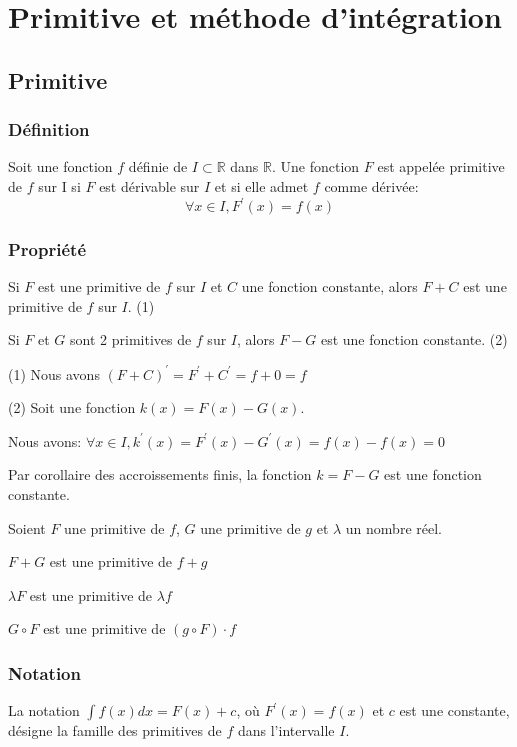 \documentclass[12pt,a4paper]{report}
\begin{document}
	\chapter[Analyse]{Primitive et méthode d'intégration}
	\section*{Primitive}
	\subsection*{Définition}
	Soit une fonction $f$ définie de $I \subset \mathbb{R}$ dans $\mathbb{R}$. Une fonction $F$ est appelée primitive de $f$ sur I si $F$ est dérivable sur $I$ et si elle admet $f$ comme dérivée:\[\forall x \in I,F^{'}(x)=f(x) \]
	\subsection*{Propriété}
	Si $F$ est une primitive de $f$ sur $I$ et $C$ une fonction constante, alors $F+C$ est une primitive de $f$ sur $I$. (1)
	
	Si $F$ et $G$ sont 2 primitives de $f$ sur $I$, alors $F-G$ est une fonction constante. (2)
	
	(1) Nous avons $(F+C)^{'}=F^{'}+C^{'}=f+0=f$
	
	(2) Soit une fonction $k(x)=F(x)-G(x)$.
	
		Nous avons: $\forall x \in I,k^{'}(x)=F^{'}(x)-G^{'}(x)=f(x)-f(x)=0$
		
		Par corollaire des accroissements finis, la fonction $k=F-G$ est une fonction constante.
		
		
	Soient $F$ une primitive de $f$, $G$ une primitive de $g$ et $\lambda$ un nombre réel.
	
	\hspace{1cm} $F+G$ est une primitive de $f+g$
	
	\hspace{1cm} $\lambda F$ est une primitive de $\lambda f$
	
	\hspace{1cm} $G \circ F$ est une primitive de $(g \circ F)\cdot f$	
	
	
	\subsection{Notation}
	La notation $\int f(x)dx=F(x)+c$, où $F^{'}(x)=f(x)$ et $c$ est une constante, désigne la famille des primitives de $f$ dans l'intervalle $I$.
	
\end{document}
